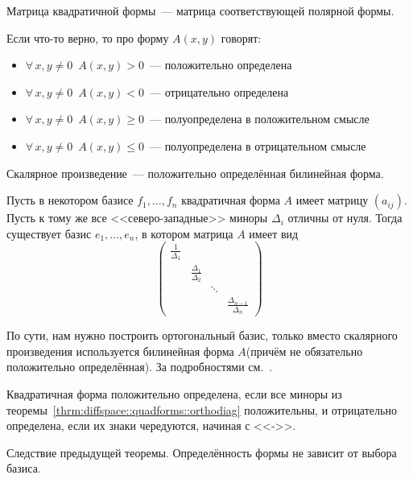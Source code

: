 \documentclass[12pt,timbord]{../../../notes}
\begin{document}
\begin{defn}\label{defn:diffspace::quadforms::quadmtx}
  Матрица квадратичной формы~--- матрица соответствующей полярной формы.
\end{defn}

\begin{defn}\label{defn:diffspace::quadforms::sign}
  Если что-то верно, то про форму $A(x,y)$ говорят:
  \begin{itemize}
    \item $\forall\, x,y \neq 0 \;\: A(x,y) > 0$~--- положительно определена
    \item $\forall\, x,y \neq 0 \;\: A(x,y) < 0$~--- отрицательно определена
    \item $\forall\, x,y \neq 0 \;\: A(x,y) \geqslant 0$~--- полуопределена в положительном смысле
    \item $\forall\, x,y \neq 0 \;\: A(x,y) \leqslant 0$~--- полуопределена в отрицательном смысле
  \end{itemize}
\end{defn}

\begin{exmp*}
  Скалярное произведение~--- положительно определённая билинейная форма.
\end{exmp*}

\begin{thrm}\label{thrm:diffspace::quadforms::orthodiag}
  Пусть в некотором базисе $f_1, \dotsc, f_n$ квадратичная форма $A$ имеет матрицу $(a_{ij})$.
  Пусть к тому же все <<северо-западные>> миноры $\Delta_i$ отличны от нуля. 
  Тогда существует базис $e_1, \dotsc,e_n$, в котором матрица $A$ имеет вид
  \[
    \begin{pmatrix}
      \frac{1}{\Delta_1} & & &\\
      & \frac{\Delta_1}{\Delta_2} & & \\
      & & \ddots & \\
      & &  & \frac{\Delta_{n-1}}{\Delta_n}
    \end{pmatrix}
  \]
\end{thrm}
\begin{ittproof}
  По сути, нам нужно построить ортогональный базис, только вместо скалярного произведения
  используется билинейная форма $A$(причём не обязательно положительно определённая).
  За подробностями см.~\cite{gelfand}.
\end{ittproof}

\begin{thrm}\label{thrm:diffspace::quadforms::silv}
  Квадратичная форма положительно определена, если все миноры из
  теоремы~\ref{thrm:diffspace::quadforms::orthodiag} положительны, и отрицательно определена, если
  их знаки чередуются, начиная с <<->>.
\end{thrm}
\begin{ittproof}
  Следствие предыдущей теоремы. Определённость формы не зависит от выбора базиса.
\end{ittproof}
\end{document}
